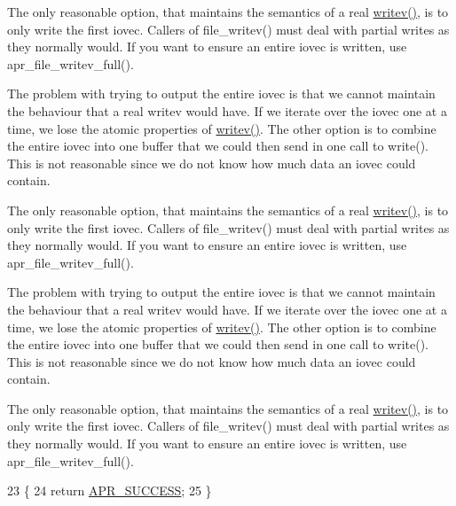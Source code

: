 The only reasonable option, that maintains the semantics of a real \hyperlink{apr__arch__os2calls_8h_a3d0f3996136a9b5ab46431c60c746efd}{writev()}, is to only write the first iovec. Callers of file\+\_\+writev() must deal with partial writes as they normally would. If you want to ensure an entire iovec is written, use apr\+\_\+file\+\_\+writev\+\_\+full().

The problem with trying to output the entire iovec is that we cannot maintain the behaviour that a real writev would have. If we iterate over the iovec one at a time, we lose the atomic properties of \hyperlink{apr__arch__os2calls_8h_a3d0f3996136a9b5ab46431c60c746efd}{writev()}. The other option is to combine the entire iovec into one buffer that we could then send in one call to write(). This is not reasonable since we do not know how much data an iovec could contain.

The only reasonable option, that maintains the semantics of a real \hyperlink{apr__arch__os2calls_8h_a3d0f3996136a9b5ab46431c60c746efd}{writev()}, is to only write the first iovec. Callers of file\+\_\+writev() must deal with partial writes as they normally would. If you want to ensure an entire iovec is written, use apr\+\_\+file\+\_\+writev\+\_\+full().

The problem with trying to output the entire iovec is that we cannot maintain the behaviour that a real writev would have. If we iterate over the iovec one at a time, we lose the atomic properties of \hyperlink{apr__arch__os2calls_8h_a3d0f3996136a9b5ab46431c60c746efd}{writev()}. The other option is to combine the entire iovec into one buffer that we could then send in one call to write(). This is not reasonable since we do not know how much data an iovec could contain.

The only reasonable option, that maintains the semantics of a real \hyperlink{apr__arch__os2calls_8h_a3d0f3996136a9b5ab46431c60c746efd}{writev()}, is to only write the first iovec. Callers of file\+\_\+writev() must deal with partial writes as they normally would. If you want to ensure an entire iovec is written, use apr\+\_\+file\+\_\+writev\+\_\+full().
\begin{DoxyCode}
23 \{
24     \textcolor{keywordflow}{return} \hyperlink{group__apr__errno_ga9ee311b7bf1c691dc521d721339ee2a6}{APR\_SUCCESS};
25 \}
\end{DoxyCode}

